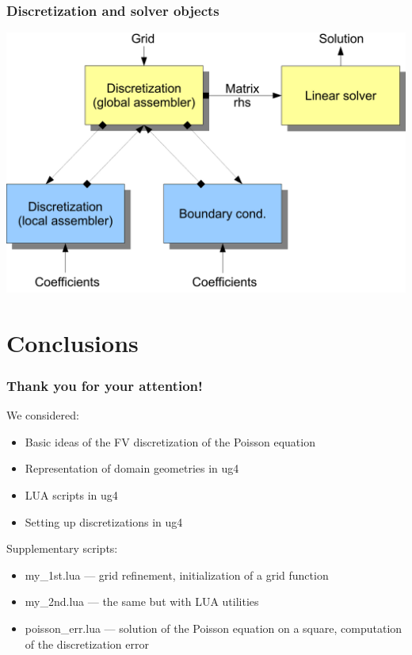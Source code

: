 \documentclass[xcolor=dvipsnames]{beamer}
\begin{document}
\begin {frame} [t]
\frametitle {Discretization and solver objects}
\centerline {\includegraphics [width=1.05\textwidth] {Discretization}}
\end {frame}

\section {Conclusions}

\begin {frame} [t]
\frametitle {Thank you for your attention!}
We considered:
\begin {itemize}
	\item Basic ideas of the FV discretization of the Poisson equation
	\item Representation of domain geometries in ug4
	\item LUA scripts in ug4
	\item Setting up discretizations in ug4
\end {itemize}

\vspace{3ex}
Supplementary scripts:
\begin {itemize}
	\item my\_1st.lua --- grid refinement, initialization of a grid function
	\item my\_2nd.lua --- the same but with LUA utilities
	\item poisson\_err.lua --- solution of the Poisson equation on a square,
		computation of the discretization error
\end {itemize}
\end {frame}
\end{document}
